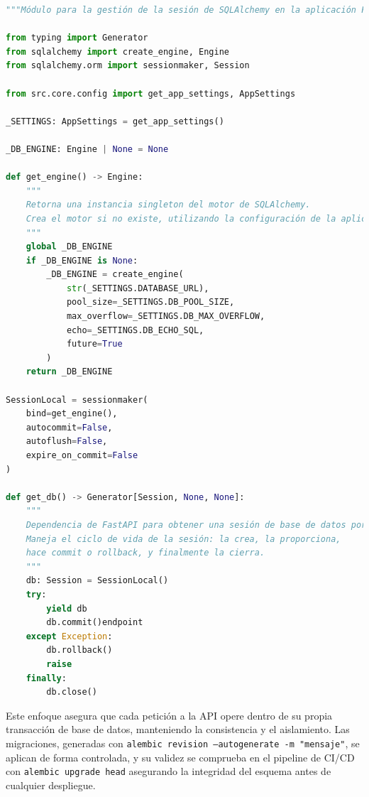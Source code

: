 \clearpage
\begin{lstlisting}[language=python,
                   caption={Gestión de la sesión de SQLAlchemy en \texttt{src/database/session.py} (extracto relevante).},
                   label={lst:desarrollo_db-session}, % Label actualizada
                   basicstyle=\fontsize{8}{9.5}\ttfamily]
"""Módulo para la gestión de la sesión de SQLAlchemy en la aplicación FastAPI."""

from typing import Generator
from sqlalchemy import create_engine, Engine
from sqlalchemy.orm import sessionmaker, Session

from src.core.config import get_app_settings, AppSettings

_SETTINGS: AppSettings = get_app_settings()

_DB_ENGINE: Engine | None = None

def get_engine() -> Engine:
    """
    Retorna una instancia singleton del motor de SQLAlchemy.
    Crea el motor si no existe, utilizando la configuración de la aplicación.
    """
    global _DB_ENGINE
    if _DB_ENGINE is None:
        _DB_ENGINE = create_engine(
            str(_SETTINGS.DATABASE_URL),
            pool_size=_SETTINGS.DB_POOL_SIZE,
            max_overflow=_SETTINGS.DB_MAX_OVERFLOW,
            echo=_SETTINGS.DB_ECHO_SQL,
            future=True
        )
    return _DB_ENGINE

SessionLocal = sessionmaker(
    bind=get_engine(),
    autocommit=False,
    autoflush=False,
    expire_on_commit=False
)

def get_db() -> Generator[Session, None, None]:
    """
    Dependencia de FastAPI para obtener una sesión de base de datos por petición.
    Maneja el ciclo de vida de la sesión: la crea, la proporciona,
    hace commit o rollback, y finalmente la cierra.
    """
    db: Session = SessionLocal()
    try:
        yield db
        db.commit()endpoint
    except Exception:
        db.rollback()
        raise
    finally:
        db.close()
\end{lstlisting}

Este enfoque asegura que cada petición a la API opere dentro de su propia transacción de base de datos, manteniendo la consistencia y el aislamiento. Las migraciones, generadas con \texttt{alembic revision --autogenerate -m "mensaje"}, se aplican de forma controlada, y su validez se comprueba en el pipeline de CI/CD con \texttt{alembic upgrade head} asegurando la integridad del esquema antes de cualquier despliegue.

